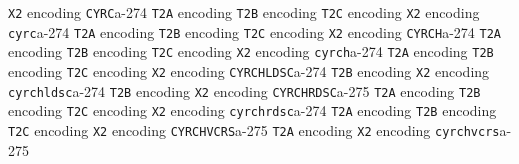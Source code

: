 \documentclass[twoside]{ltxdoc}
\makeatletter
\renewenvironment{theindex}{%
   \@restonecoltrue
   \if@twocolumn\@restonecolfalse\fi
   \columnseprule \z@
   \columnsep 35\p@
   \twocolumn[\index@prologue]%
   \IndexParms
   \let\item\@idxitem
   \ignorespaces
}{\if@restonecol\onecolumn\else\clearpage\fi}
\makeatother
\begin{document}
\begin{theindex}
    \subitem \texttt  {X2} encoding\pfill {}
  \item \texttt  {CYRC}\pfill a-274
    \subitem \texttt  {T2A} encoding\pfill {}
    \subitem \texttt  {T2B} encoding\pfill {}
    \subitem \texttt  {T2C} encoding\pfill {}
    \subitem \texttt  {X2} encoding\pfill {}
  \item \texttt  {cyrc}\pfill a-274
    \subitem \texttt  {T2A} encoding\pfill {}
    \subitem \texttt  {T2B} encoding\pfill {}
    \subitem \texttt  {T2C} encoding\pfill {}
    \subitem \texttt  {X2} encoding\pfill {}
  \item \texttt  {CYRCH}\pfill a-274
    \subitem \texttt  {T2A} encoding\pfill {}
    \subitem \texttt  {T2B} encoding\pfill {}
    \subitem \texttt  {T2C} encoding\pfill {}
    \subitem \texttt  {X2} encoding\pfill {}
  \item \texttt  {cyrch}\pfill a-274
    \subitem \texttt  {T2A} encoding\pfill {}
    \subitem \texttt  {T2B} encoding\pfill {}
    \subitem \texttt  {T2C} encoding\pfill {}
    \subitem \texttt  {X2} encoding\pfill {}
  \item \texttt  {CYRCHLDSC}\pfill a-274
    \subitem \texttt  {T2B} encoding\pfill {}
    \subitem \texttt  {X2} encoding\pfill {}
  \item \texttt  {cyrchldsc}\pfill a-274
    \subitem \texttt  {T2B} encoding\pfill {}
    \subitem \texttt  {X2} encoding\pfill {}
  \item \texttt  {CYRCHRDSC}\pfill a-275
    \subitem \texttt  {T2A} encoding\pfill {}
    \subitem \texttt  {T2B} encoding\pfill {}
    \subitem \texttt  {T2C} encoding\pfill {}
    \subitem \texttt  {X2} encoding\pfill {}
  \item \texttt  {cyrchrdsc}\pfill a-274
    \subitem \texttt  {T2A} encoding\pfill {}
    \subitem \texttt  {T2B} encoding\pfill {}
    \subitem \texttt  {T2C} encoding\pfill {}
    \subitem \texttt  {X2} encoding\pfill {}
  \item \texttt  {CYRCHVCRS}\pfill a-275
    \subitem \texttt  {T2A} encoding\pfill {}
    \subitem \texttt  {X2} encoding\pfill {}
  \item \texttt  {cyrchvcrs}\pfill a-275

\end{theindex}
\end{document}
